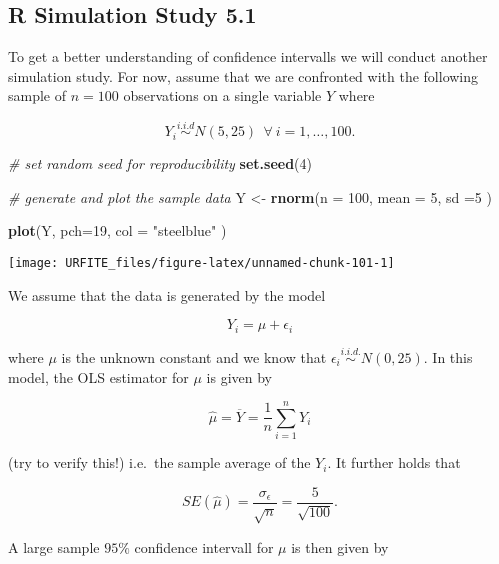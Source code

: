 \documentclass[]{book}
\newenvironment{Shaded}{\begin{snugshade}}{\end{snugshade}}
\newcommand{\KeywordTok}[1]{\textcolor[rgb]{0.13,0.29,0.53}{\textbf{#1}}}
\newcommand{\DataTypeTok}[1]{\textcolor[rgb]{0.13,0.29,0.53}{#1}}
\newcommand{\DecValTok}[1]{\textcolor[rgb]{0.00,0.00,0.81}{#1}}
\newcommand{\StringTok}[1]{\textcolor[rgb]{0.31,0.60,0.02}{#1}}
\newcommand{\CommentTok}[1]{\textcolor[rgb]{0.56,0.35,0.01}{\textit{#1}}}
\newcommand{\NormalTok}[1]{#1}
\theoremstyle{definition}
\theoremstyle{definition}
\theoremstyle{definition}
\theoremstyle{remark}
\begin{document}
\subsection*{R Simulation Study 5.1}\label{r-simulation-study-5.1}

To get a better understanding of confidence intervalls we will conduct
another simulation study. For now, assume that we are confronted with
the following sample of \(n=100\) observations on a single variable
\(Y\) where

\[ Y_i \overset{i.i.d}{\sim} N(5,25) \ \ \forall \ i = 1, \dots, 100.\]

\begin{Shaded}
\begin{Highlighting}[]
\CommentTok{# set random seed for reproducibility}
\KeywordTok{set.seed}\NormalTok{(}\DecValTok{4}\NormalTok{)}

\CommentTok{# generate and plot the sample data}
\NormalTok{Y <-}\StringTok{ }\KeywordTok{rnorm}\NormalTok{(}\DataTypeTok{n =} \DecValTok{100}\NormalTok{, }
           \DataTypeTok{mean =} \DecValTok{5}\NormalTok{, }
           \DataTypeTok{sd =}\DecValTok{5}
\NormalTok{           )}

\KeywordTok{plot}\NormalTok{(Y, }
     \DataTypeTok{pch=}\DecValTok{19}\NormalTok{, }
     \DataTypeTok{col =} \StringTok{"steelblue"}
\NormalTok{     )}
\end{Highlighting}
\end{Shaded}

\begin{center}\texttt{[image: URFITE\_files/figure-latex/unnamed-chunk-101-1]} \end{center}

We assume that the data is generated by the model

\[ Y_i = \mu + \epsilon_i \]

where \(\mu\) is the unknown constant and we know that
\(\epsilon_i \overset{i.i.d.}{\sim} N(0,25)\). In this model, the OLS
estimator for \(\mu\) is given by

\[ \hat\mu = \overline{Y} = \frac{1}{n} \sum_{i=1}^n Y_i \]

(try to verify this!) i.e.~the sample average of the \(Y_i\). It further
holds that

\[ SE(\hat\mu) = \frac{\sigma_{\epsilon}}{\sqrt{n}} = \frac{5}{\sqrt{100}}. \]

A large sample \(95\%\) confidence intervall for \(\mu\) is then given
by
\end{document}
